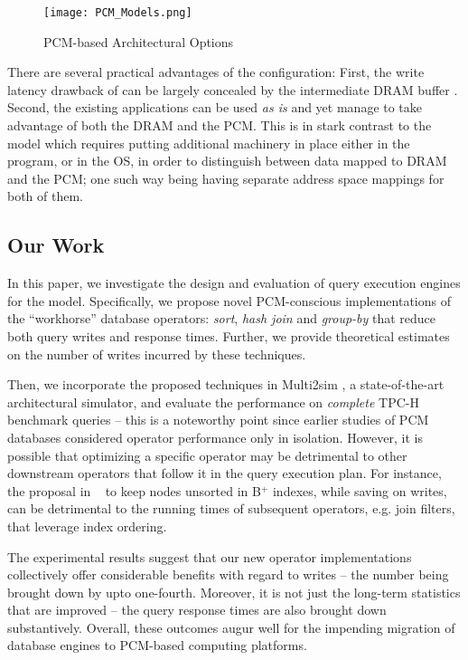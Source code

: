 \begin{figure}[htbp]
	\texttt{[image: PCM\_Models.png]}\centering
	\caption{PCM-based Architectural Options}
	\label{fig:pcm_models}
\end{figure}
 
There are several practical advantages of the \model{}
configuration: First,
the write latency drawback of \modelPcmRam{} can be largely concealed by the intermediate DRAM
buffer \cite{qureshi}. Second, the existing applications can be used \textit{as is} and yet manage to take advantage of both the DRAM and the PCM. This is in stark contrast to the \modelExplicit{} model which requires putting additional machinery in place either in the program, or in the OS, in order to distinguish between data mapped to DRAM and the PCM; one such way being having separate address space mappings for both of them.

\subsection*{Our Work}
In this paper, we investigate the design and evaluation of query execution engines for the \model{} model. Specifically, we propose novel PCM-conscious
implementations of the ``workhorse'' database operators: \textit{sort},
\textit{hash join} and \textit{group-by} that reduce both query writes and response times.  Further, we provide theoretical
estimates on the number of writes incurred by these techniques.

Then, we incorporate the proposed techniques in Multi2sim \cite{multi2sim},
a state-of-the-art architectural simulator, and evaluate the performance
on \emph{complete} TPC-H benchmark queries -- this is a noteworthy point since
earlier studies of PCM databases considered operator performance only
in isolation. However, it is possible that optimizing a specific operator
may be detrimental to other downstream operators that follow it in the query
execution plan. For instance, the proposal in ~\cite{chen} to keep nodes unsorted in
B$^+$ indexes, while saving on writes, can be detrimental
to the running times of subsequent operators, e.g. join filters, that 
leverage index ordering.

The experimental results suggest that our new operator implementations
collectively offer considerable benefits with regard to writes -- the number being brought
down by upto one-fourth.
Moreover, it is not just the long-term statistics that are improved --
the query response times are also brought down substantively.  Overall,
these outcomes augur well for the impending migration of database engines to PCM-based computing platforms.

